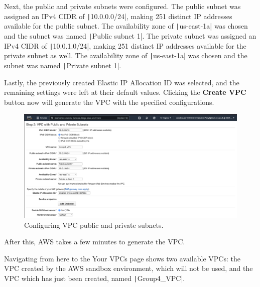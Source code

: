 Next, the public and private subnets were configured.
The public subnet was assigned an IPv4 CIDR of \texttt|10.0.0.0/24|, making 251 distinct IP addresses available
for the public subnet.
The availability zone of \texttt|us-east-1a| was chosen and the subnet was named
\texttt|Public subnet 1|.
The private subnet was assigned an IPv4 CIDR of \texttt|10.0.1.0/24|, making 251 distinct IP addresses
available for the private subnet as well.
The availability zone of \texttt|us-east-1a| was chosen and the subnet was named
\texttt|Private subnet 1|.

Lastly, the previously created Elastic IP Allocation ID was selected, and the remaining settings were left at their
default values.
Clicking the \textbf{Create VPC} button now will generate the VPC with the specified configurations.

\begin{figure}[!htbp]
    \centering
    \includegraphics[width=115mm]{resources/vpc/step_2_vpc_with_public_and_private_subnets}
    \caption{Configuring VPC public and private subnets.}
    \label{fig:vpc-step-2}
\end{figure}

\clearpage
After this, AWS takes a few minutes to generate the VPC\@.


Navigating from here to the Your VPCs page shows two available VPCs: the VPC created by the AWS sandbox
environment, which will not be used, and the VPC which has just been created, named \texttt|Group4_VPC|.

